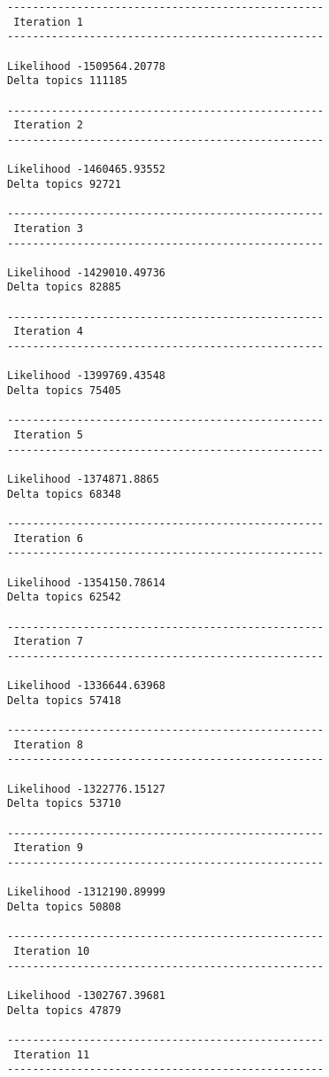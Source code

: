 \documentclass{article}
\begin{document}
    \begin{Verbatim}[commandchars=\\\{\}]
-------------------------------------------------- 
 Iteration 1 
-------------------------------------------------- 

Likelihood -1509564.20778
Delta topics 111185 

-------------------------------------------------- 
 Iteration 2 
-------------------------------------------------- 

Likelihood -1460465.93552
Delta topics 92721 

-------------------------------------------------- 
 Iteration 3 
-------------------------------------------------- 

Likelihood -1429010.49736
Delta topics 82885 

-------------------------------------------------- 
 Iteration 4 
-------------------------------------------------- 

Likelihood -1399769.43548
Delta topics 75405 

-------------------------------------------------- 
 Iteration 5 
-------------------------------------------------- 

Likelihood -1374871.8865
Delta topics 68348 

-------------------------------------------------- 
 Iteration 6 
-------------------------------------------------- 

Likelihood -1354150.78614
Delta topics 62542 

-------------------------------------------------- 
 Iteration 7 
-------------------------------------------------- 

Likelihood -1336644.63968
Delta topics 57418 

-------------------------------------------------- 
 Iteration 8 
-------------------------------------------------- 

Likelihood -1322776.15127
Delta topics 53710 

-------------------------------------------------- 
 Iteration 9 
-------------------------------------------------- 

Likelihood -1312190.89999
Delta topics 50808 

-------------------------------------------------- 
 Iteration 10 
-------------------------------------------------- 

Likelihood -1302767.39681
Delta topics 47879 

-------------------------------------------------- 
 Iteration 11 
-------------------------------------------------- 


\end{Verbatim}
\end{document}
